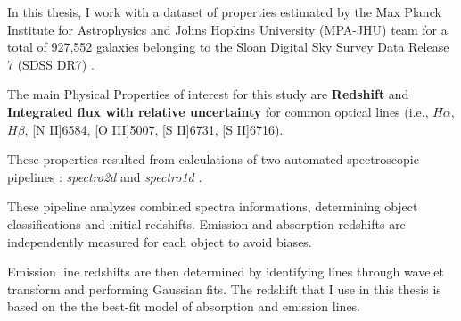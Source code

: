 In this thesis, I work with a dataset of properties estimated by the Max Planck Institute for Astrophysics and Johns Hopkins University (MPA-JHU) team for a total of 927,552 galaxies belonging to the Sloan Digital Sky Survey Data Release 7 (SDSS DR7) \cite{2009ApJS..182..543A, mpa-sdss-dr7}.

The main Physical Properties of interest for this study are \textbf{Redshift} and \textbf{Integrated flux with relative uncertainty} for common optical lines (i.e., $H\alpha$, $H\beta$, [N II]6584, [O III]5007, [S II]6731, [S II]6716).

These properties resulted from calculations of two automated spectroscopic pipelines : \textit{spectro2d} and \textit{spectro1d} \cite{2002AJ....123..485S}.

 These pipeline analyzes combined spectra informations, determining object classifications and initial redshifts. Emission and absorption redshifts are independently measured for each object to avoid biases.

Emission line redshifts are then determined by identifying lines through wavelet transform and performing Gaussian fits.
The redshift that I use in this thesis is based on the the best-fit model of absorption and emission lines. 

